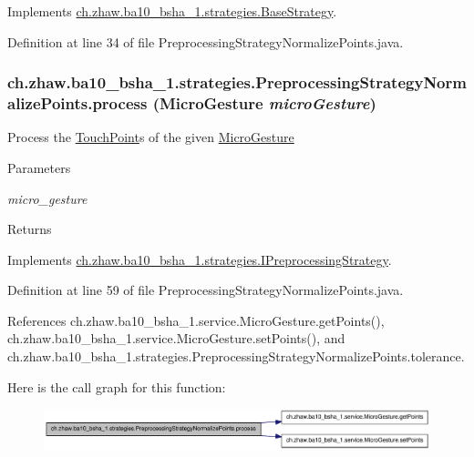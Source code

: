 Implements \hyperlink{classch_1_1zhaw_1_1ba10__bsha__1_1_1strategies_1_1BaseStrategy_af6ea27835befac71906915236a347450}{ch.zhaw.ba10\_\-bsha\_\-1.strategies.BaseStrategy}.

Definition at line 34 of file PreprocessingStrategyNormalizePoints.java.\hypertarget{classch_1_1zhaw_1_1ba10__bsha__1_1_1strategies_1_1PreprocessingStrategyNormalizePoints_a0b7ffa8b9a2f6d98a2b871fc4afa39f9}{
\subsubsection[{process}]{ ch.zhaw.ba10\_\-bsha\_\-1.strategies.PreprocessingStrategyNormalizePoints.process ({\bf MicroGesture} {\em microGesture})}}
\label{classch_1_1zhaw_1_1ba10__bsha__1_1_1strategies_1_1PreprocessingStrategyNormalizePoints_a0b7ffa8b9a2f6d98a2b871fc4afa39f9}
Process the \hyperlink{classch_1_1zhaw_1_1ba10__bsha__1_1_1TouchPoint}{TouchPoint}s of the given \hyperlink{}{MicroGesture}


\begin{DoxyParams}{Parameters}
\item[{\em micro\_\-gesture}]\end{DoxyParams}
\begin{DoxyReturn}{Returns}

\end{DoxyReturn}


Implements \hyperlink{interfacech_1_1zhaw_1_1ba10__bsha__1_1_1strategies_1_1IPreprocessingStrategy_a3e3885dce8fda7b79dc514078f11ad62}{ch.zhaw.ba10\_\-bsha\_\-1.strategies.IPreprocessingStrategy}.

Definition at line 59 of file PreprocessingStrategyNormalizePoints.java.

References ch.zhaw.ba10\_\-bsha\_\-1.service.MicroGesture.getPoints(), ch.zhaw.ba10\_\-bsha\_\-1.service.MicroGesture.setPoints(), and ch.zhaw.ba10\_\-bsha\_\-1.strategies.PreprocessingStrategyNormalizePoints.tolerance.

Here is the call graph for this function:\nopagebreak
\begin{figure}[H]
\begin{center}
\leavevmode
\includegraphics[width=351pt]{classch_1_1zhaw_1_1ba10__bsha__1_1_1strategies_1_1PreprocessingStrategyNormalizePoints_a0b7ffa8b9a2f6d98a2b871fc4afa39f9_cgraph}
\end{center}
\end{figure}


